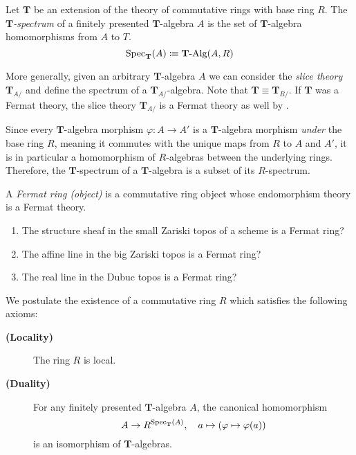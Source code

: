 {
\newcommand{\cat}[1]{\mathcal{#1}}
\newcommand{\theory}[1]{\mathbf{#1}}
\newcommand{\Psh}{\mathop{PSh}}
\newcommand{\Set}{\mathsf{Set}}
\newcommand{\TT}{\theory{T}}
\newcommand{\EE}{\theory{E}}
\newcommand{\Com}{\theory{Com}}
\newcommand{\diffquot}[2]{\frac{\Delta{#1}}{\Delta{#2}}}

\begin{definition}
  Let \(\TT\) be an extension of the theory of commutative rings with base ring \(R\).
  The \emph{\(\TT\)-spectrum} of a finitely presented \(\TT\)-algebra \(A\) is the set of \(\TT\)-algebra homomorphisms from \(A\) to \(T\).
  \[\Spec_\TT(A) \colonequiv \Alg{\TT}(A,R)\]
\end{definition}

\begin{remark}
  More generally, given an arbitrary \(\TT\)-algebra \(A\) we can consider the \emph{slice theory} \(\TT_{A/}\) and define the spectrum of a \(\TT_{A/}\)-algebra.
  Note that \(\TT \equiv \TT_{R/}\).
  If \(\TT\) was a Fermat theory, the slice theory \(\TT_{A/}\) is a Fermat theory as well by \cite[Proposition 1.5']{DK84}.
\end{remark}

Since every \(\TT\)-algebra morphism \(\varphi : A \to A'\) is a \(\TT\)-algebra morphism \emph{under} the base ring \(R\), meaning it commutes with the unique maps from \(R\) to \(A\) and \(A'\),  it is in particular a homomorphism of \(R\)-algebras between the underlying rings.
Therefore, the \(\TT\)-spectrum of a \(\TT\)-algebra is a subset of its \(R\)-spectrum.

\begin{definition}
  A \emph{Fermat ring (object)} is a commutative ring object whose endomorphism theory is a Fermat theory.
\end{definition}

\begin{example}
  \begin{enumerate}
    \item
      The structure sheaf in the small Zariski topos of a scheme is a Fermat ring?
    \item
      The affine line in the big Zariski topos is a Fermat ring?
    \item
      The real line in the Dubuc topos is a Fermat ring?
  \end{enumerate}
\end{example}


We postulate the existence of a commutative ring \(R\) which satisfies the following axioms:
\begin{description}
  \item[\textbf{(Locality)}]
    The ring \(R\) is local.
  \item[\textbf{(Duality)}]
    For any finitely presented \(\TT\)-algebra \(A\), the canonical homomorphism
    \[A \to R^{\Spec_\TT(A)}, \quad a \mapsto (\varphi \mapsto \varphi(a))\]
    is an isomorphism of \(\TT\)-algebras.
\end{description}

}
